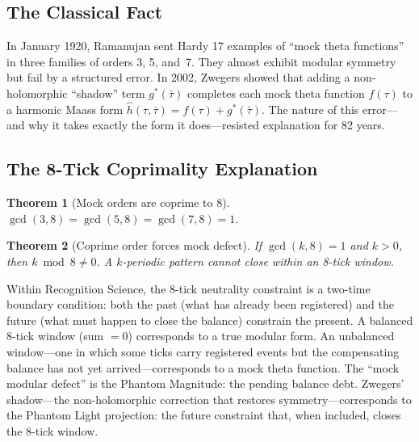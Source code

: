 \documentclass[11pt]{article}
\def\leanverified{}
\theoremstyle{plain}
\newtheorem{theorem}{Theorem}[section]
\theoremstyle{definition}
\theoremstyle{remark}
\newcommand{\leanverified}{\textsuperscript{\textnormal{[\textsc{Lean}]}}}
\begin{document}
\subsection{The Classical Fact}

In January 1920, Ramanujan sent Hardy 17 examples of ``mock theta functions''
in three families of orders 3, 5, and~7.
They almost exhibit modular symmetry but fail by a structured error.
In 2002, Zwegers \cite{Zwegers2002} showed that adding a non-holomorphic ``shadow'' term
$g^*(\bar{\tau})$ completes each mock theta function $f(\tau)$ to a
harmonic Maass form $\hat{h}(\tau, \bar{\tau}) = f(\tau) + g^*(\bar{\tau})$.
The nature of this error---and why it takes exactly the form it does---resisted explanation for 82 years.

\subsection{The 8-Tick Coprimality Explanation}

\begin{theorem}[Mock orders are coprime to 8]\leanverified\label{thm:coprime}
$\gcd(3,8) = \gcd(5,8) = \gcd(7,8) = 1.$
\end{theorem}

\begin{theorem}[Coprime order forces mock defect]\leanverified\label{thm:mock-defect}
If $\gcd(k, 8) = 1$ and $k > 0$, then $k \bmod 8 \ne 0$.
A $k$-periodic pattern cannot close within an 8-tick window.
\end{theorem}

Within Recognition Science, the 8-tick neutrality constraint is a two-time boundary condition: both the past (what has already been registered) and the future (what must happen to close the balance) constrain the present.
A balanced 8-tick window (sum $= 0$) corresponds to a true modular form.
An unbalanced window---one in which some ticks carry registered events but the compensating balance has not yet arrived---corresponds to a mock theta function.
The ``mock modular defect'' is the Phantom Magnitude: the pending balance debt.
Zwegers' shadow---the non-holomorphic correction that restores symmetry---corresponds to the Phantom Light projection: the future constraint that, when included, closes the 8-tick window.
\end{document}

